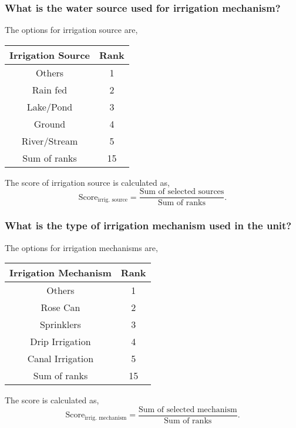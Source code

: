 \documentclass[oneside,twocolumn]{article}
\newcommand{\tsub}[2]{\text{#1}_{\text{#2}}}
\newcommand{\dsub}[2]{\dfrac{\text{#1}}{\text{#2}}}
\newenvironment{ttable}
               {
                 \begin{center}
                   \begin{tabular}{c|c}
                     \hline
               }
               {
                 \\ \hline
                   \end{tabular}
                 \end{center}
               }
\begin{document}
               \subsubsection{What is the water source used for irrigation mechanism?}
               The options for irrigation source are,
               \begin{ttable}
                 Irrigation Source & Rank \\ \hline
                 Others & 1 \\
                 Rain fed & 2 \\
                 Lake/Pond & 3 \\
                 Ground & 4 \\
                 River/Stream & 5 \\ \hline
                 Sum of ranks & 15
               \end{ttable}

               The score of irrigation source is calculated as,
               \[
               \tsub{Score}{irrig. source} = \dsub{Sum of selected sources}{Sum of ranks}.
               \]

               \subsubsection{What is the type of irrigation mechanism used in the unit?}
               The options for irrigation mechanisms are,
               \begin{ttable}
                 Irrigation Mechanism & Rank \\ \hline
                 Others & 1 \\
                 Rose Can & 2 \\
                 Sprinklers & 3 \\
                 Drip Irrigation & 4 \\
                 Canal Irrigation & 5 \\ \hline
                 Sum of ranks & 15
               \end{ttable}

               The score is calculated as,
               \[
               \tsub{Score}{irrig. mechanism} = \dsub{Sum of selected mechanism}{Sum of ranks}.
               \]
               
\end{document}
